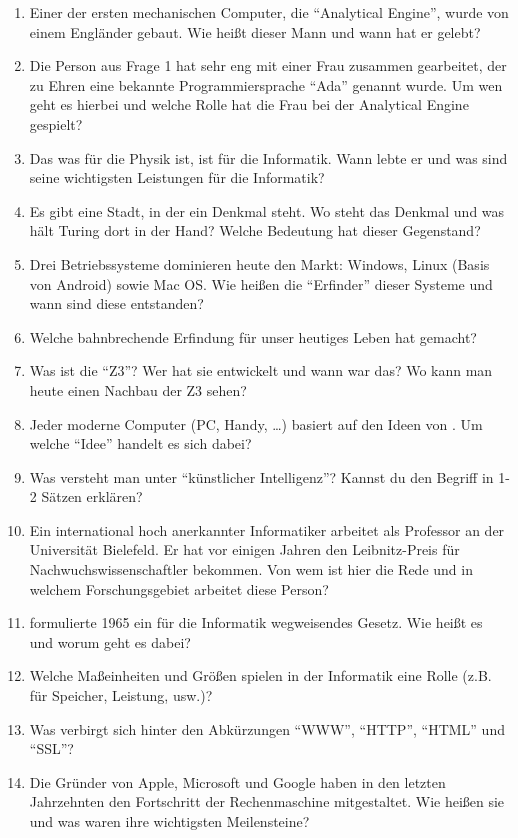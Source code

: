 \documentclass[11pt, a4paper, ngerman]{arbeitsblatt}
\begin{document}
\begin{rahmen}
\begin{enumerate}
	\item Einer der ersten mechanischen Computer, die \enquote{Analytical Engine}, wurde von einem Engländer gebaut. Wie heißt dieser Mann und wann hat er gelebt?
	\item Die Person aus Frage 1 hat sehr eng mit einer Frau zusammen gearbeitet, der zu Ehren eine bekannte Programmiersprache \enquote{Ada} genannt wurde. Um wen geht es hierbei und welche Rolle hat die Frau bei der Analytical Engine gespielt?
	\item Das was  für die Physik ist, ist  für die Informatik.
	Wann lebte er und was sind seine wichtigsten Leistungen für die Informatik?
	\item Es gibt eine Stadt, in der ein Denkmal  steht. Wo steht das Denkmal und was hält Turing dort in der Hand? Welche Bedeutung hat dieser Gegenstand?
	\item Drei Betriebssysteme dominieren heute den Markt: Windows, Linux (Basis von Android) sowie Mac OS. Wie heißen die \enquote{Erfinder} dieser Systeme und wann sind diese entstanden?
	\item Welche bahnbrechende Erfindung für unser heutiges Leben hat  gemacht?
	\item Was ist die \enquote{Z3}? Wer hat sie entwickelt und wann war das? Wo kann man heute einen Nachbau der Z3 sehen?
	\item Jeder moderne Computer (PC, Handy, …) basiert auf den Ideen von . Um welche \enquote{Idee} handelt es sich dabei?
	\item Was versteht man unter \enquote{künstlicher Intelligenz}? Kannst du den Begriff in 1-2 Sätzen erklären?
	\item Ein international hoch anerkannter Informatiker arbeitet als Professor an der Universität Bielefeld. Er hat vor einigen Jahren den Leibnitz-Preis für Nachwuchswissenschaftler bekommen. Von wem ist hier die Rede und in welchem Forschungsgebiet arbeitet diese Person?
	\item {} formulierte 1965 ein für die Informatik wegweisendes Gesetz. Wie heißt es und worum geht es dabei?
	\item Welche Maßeinheiten und Größen spielen in der Informatik eine Rolle (z.B. für Speicher, Leistung, usw.)?
	\item Was verbirgt sich hinter den Abkürzungen \enquote{WWW}, \enquote{HTTP}, \enquote{HTML} und \enquote{SSL}?
	\item Die Gründer von Apple, Microsoft und Google haben in den letzten Jahrzehnten den Fortschritt der Rechenmaschine mitgestaltet. Wie heißen sie und was waren ihre wichtigsten Meilensteine?
\end{enumerate}
\end{rahmen}
\end{document}
